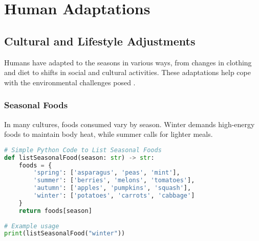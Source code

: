 \chapter{Human Adaptations}

\section{Cultural and Lifestyle Adjustments}

Humans have adapted to the seasons in various ways, from changes in clothing and diet to shifts in social and cultural activities. These adaptations help cope with the environmental challenges posed .

\subsection{Seasonal Foods}

In many cultures, foods consumed vary by season. Winter demands high-energy foods to maintain body heat, while summer calls for lighter meals.

\begin{lstlisting}[language=Python]
# Simple Python Code to List Seasonal Foods
def listSeasonalFood(season: str) -> str:
	foods = {
		'spring': ['asparagus', 'peas', 'mint'],
		'summer': ['berries', 'melons', 'tomatoes'],
		'autumn': ['apples', 'pumpkins', 'squash'],
		'winter': ['potatoes', 'carrots', 'cabbage']
	}
	return foods[season]
	
# Example usage
print(listSeasonalFood("winter"))
\end{lstlisting}

